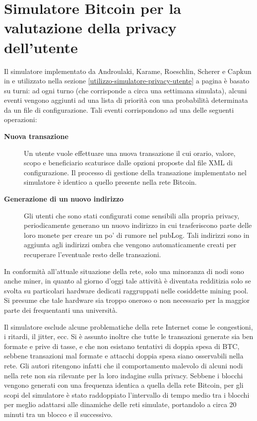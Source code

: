 \chapter{Simulatore Bitcoin per la valutazione della privacy dell'utente}

Il simulatore implementato da Androulaki, Karame, Roeschlin, Scherer e Capkun in \cite{user-privacy} e utilizzato nella sezione \ref{utilizzo-simulatore-privacy-utente} a pagina \pageref{utilizzo-simulatore-privacy-utente} è basato su turni: ad ogni turno (che corrisponde a circa una settimana simulata), alcuni eventi vengono aggiunti ad una lista di priorità con una probabilità determinata da un file di configurazione.
Tali eventi corrispondono ad una delle seguenti operazioni:

\begin{description}
    \item[\textbf{Nuova transazione}]
      Un utente vuole effettuare una nuova transazione il cui orario, valore, scopo e beneficiario scaturisce dalle opzioni proposte dal file XML di configurazione. Il processo di gestione della transazione implementato nel simulatore è identico a quello presente nella rete Bitcoin.
    \item[\textbf{Generazione di un nuovo indirizzo}]
      Gli utenti che sono stati configurati come sensibili alla propria privacy, periodicamente generano un nuovo indirizzo in cui trasferiscono parte delle loro monete per creare un po' di rumore nel pubLog. Tali indirizzi sono in aggiunta agli indirizzi ombra che vengono automaticamente creati per recuperare l'eventuale resto delle transazioni.
\end{description}

In conformità all'attuale situazione della rete, solo una minoranza di nodi sono anche miner, in quanto al giorno d'oggi tale attività è diventata redditizia solo se svolta su particolari hardware dedicati raggruppati nelle cosiddette mining pool. Si presume che tale hardware sia troppo oneroso o non necessario per la maggior parte dei frequentanti una università.

Il simulatore esclude alcune problematiche della rete Internet come le congestioni, i ritardi, il jitter, ecc.
Si è assunto inoltre che tutte le transazioni generate sia ben formate e prive di tasse, e che non esistano tentativi di doppia spesa di BTC, sebbene transazioni mal formate e attacchi doppia spesa siano osservabili nella rete.
Gli autori ritengono infatti che il comportamento malevolo di alcuni nodi nella rete non sia rilevante per la loro indagine sulla privacy.
Sebbene i blocchi vengono generati con una frequenza identica a quella della rete Bitcoin, per gli scopi del simulatore è stato raddoppiato l'intervallo di tempo medio tra i blocchi per meglio adattarsi alle dinamiche delle reti simulate, portandolo a circa 20 minuti tra un blocco e il successivo.

